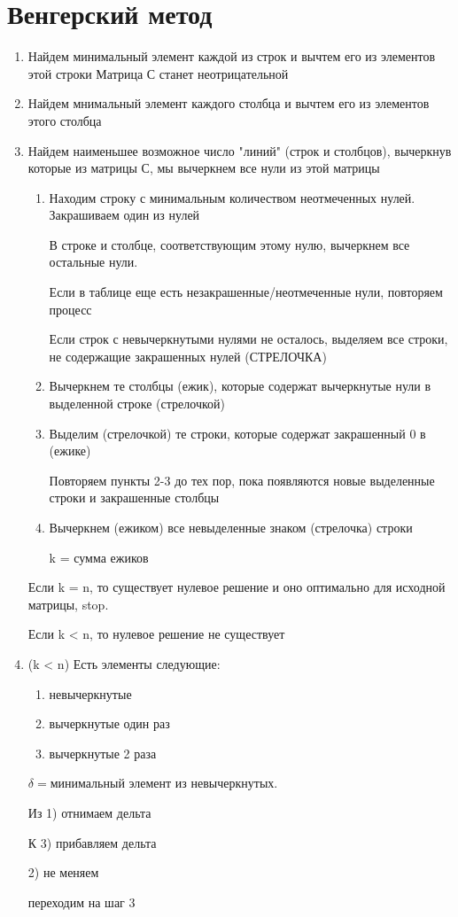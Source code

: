\documentclass[a4paper, 12pt]{article}
\theoremstyle{definition}
\theoremstyle{remark}
\begin{document}
\section*{Венгерский метод}
    \begin{enumerate}
        \item Найдем минимальный элемент каждой из строк и вычтем его из элементов этой строки
        Матрица С станет неотрицательной
        \item Найдем мнимальный элемент каждого столбца и вычтем его из элементов этого столбца
        \item Найдем наименьшее возможное число "линий" (строк и столбцов), вычеркнув которые из матрицы
        С, мы вычеркнем все нули из этой матрицы
        \begin{enumerate}
            \item Находим строку с минимальным количеством неотмеченных нулей. 
            Закрашиваем один из нулей

            В строке и столбце, соответствующим этому нулю, вычеркнем все остальные нули.

            Если в таблице еще есть незакрашенные/неотмеченные нули, повторяем процесс

            Если строк с невычеркнутыми нулями не осталось, выделяем все строки, не содержащие
            закрашенных нулей (СТРЕЛОЧКА)
            \item Вычеркнем те столбцы (ежик), которые содержат вычеркнутые нули в выделенной строке (стрелочкой)
            \item Выделим (стрелочкой) те строки, которые содержат закрашенный 0 в (ежике)

            Повторяем пункты 2-3 до тех пор, пока появляются новые выделенные строки и закрашенные столбцы
            \item Вычеркнем (ежиком) все невыделенные знаком (стрелочка) строки

            k = сумма ежиков
        \end{enumerate}
        
        Если k = n, то существует нулевое решение и оно оптимально для исходной матрицы, stop.

        Если k < n, то нулевое решение не существует
        \item (k < n)
        Есть элементы следующие:
        \begin{enumerate}
            \item невычеркнутые
            \item вычеркнутые один раз
            \item вычеркнутые 2 раза
        \end{enumerate}
        $\delta = $минимальный элемент из невычеркнутых.

        Из 1) отнимаем дельта

        К 3) прибавляем дельта

        2) не меняем
        
        переходим на шаг 3
    \end{enumerate}
\end{document}
